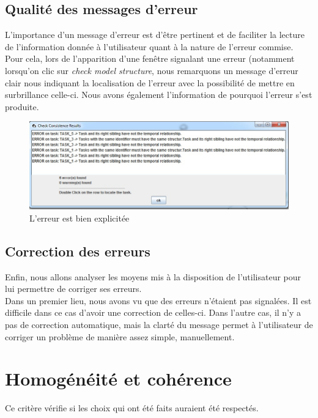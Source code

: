 \documentclass[12pt, a4paper]{article}
\begin{document}
\subsection{Qualité des messages d'erreur}
L'importance d'un message d'erreur est d'être pertinent et de faciliter la lecture de l'information donnée à l'utilisateur quant à la nature de l'erreur commise.\\


Pour cela, lors de l'apparition d'une fenêtre signalant une erreur (notamment lorsqu'on clic sur \emph{check model structure}, nous remarquons un message d'erreur clair nous indiquant la localisation de l'erreur avec la possibilité de mettre en surbrillance celle-ci. Nous avons également l'information de pourquoi l'erreur s'est produite. %

\begin{figure}[h]
\begin{center}
   \includegraphics[scale = 0.7]{erreur.jpg}
	\caption{L'erreur est bien explicitée}
	\end{center}
\end{figure}

\subsection{Correction des erreurs}
Enfin, nous allons analyser les moyens mis à la disposition de l'utilisateur pour lui permettre de corriger ses erreurs.\\


Dans un premier lieu, nous avons vu que des erreurs n'étaient pas signalées. Il est difficile dans ce cas d'avoir une correction de celles-ci. Dans l'autre cas, il n'y a pas de correction automatique, mais la clarté du message permet à l'utilisateur de corriger un problème de manière assez simple, manuellement.
\section{Homogénéité et cohérence}
Ce critère vérifie si les choix qui ont été faits auraient été respectés.\\
\end{document}
